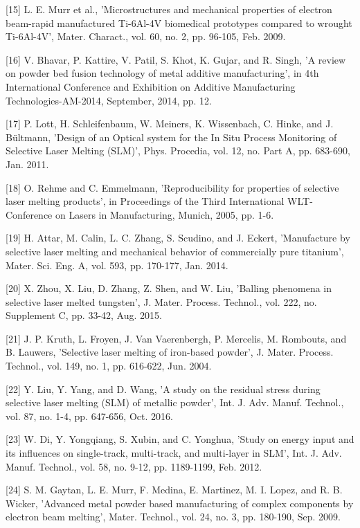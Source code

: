 \documentclass[10pt]{article}
\begin{document}
[15] L. E. Murr et al., 'Microstructures and mechanical properties of electron beam-rapid manufactured Ti-6Al-4V biomedical prototypes compared to wrought Ti-6Al-4V', Mater. Charact., vol. 60, no. 2, pp. 96-105, Feb. 2009.

[16] V. Bhavar, P. Kattire, V. Patil, S. Khot, K. Gujar, and R. Singh, 'A review on powder bed fusion technology of metal additive manufacturing', in 4th International Conference and Exhibition on Additive Manufacturing Technologies-AM-2014, September, 2014, pp. 12.

[17] P. Lott, H. Schleifenbaum, W. Meiners, K. Wissenbach, C. Hinke, and J. Bültmann, 'Design of an Optical system for the In Situ Process Monitoring of Selective Laser Melting (SLM)', Phys. Procedia, vol. 12, no. Part A, pp. 683-690, Jan. 2011.

[18] O. Rehme and C. Emmelmann, 'Reproducibility for properties of selective laser melting products', in Proceedings of the Third International WLT-Conference on Lasers in Manufacturing, Munich, 2005, pp. 1-6.

[19] H. Attar, M. Calin, L. C. Zhang, S. Scudino, and J. Eckert, 'Manufacture by selective laser melting and mechanical behavior of commercially pure titanium', Mater. Sci. Eng. A, vol. 593, pp. 170-177, Jan. 2014.

[20] X. Zhou, X. Liu, D. Zhang, Z. Shen, and W. Liu, 'Balling phenomena in selective laser melted tungsten', J. Mater. Process. Technol., vol. 222, no. Supplement C, pp. 33-42, Aug. 2015.

[21] J. P. Kruth, L. Froyen, J. Van Vaerenbergh, P. Mercelis, M. Rombouts, and B. Lauwers, 'Selective laser melting of iron-based powder', J. Mater. Process. Technol., vol. 149, no. 1, pp. 616-622, Jun. 2004.

[22] Y. Liu, Y. Yang, and D. Wang, 'A study on the residual stress during selective laser melting (SLM) of metallic powder', Int. J. Adv. Manuf. Technol., vol. 87, no. 1-4, pp. 647-656, Oct. 2016.

[23] W. Di, Y. Yongqiang, S. Xubin, and C. Yonghua, 'Study on energy input and its influences on single-track, multi-track, and multi-layer in SLM', Int. J. Adv. Manuf. Technol., vol. 58, no. 9-12, pp. 1189-1199, Feb. 2012.

[24] S. M. Gaytan, L. E. Murr, F. Medina, E. Martinez, M. I. Lopez, and R. B. Wicker, 'Advanced metal powder based manufacturing of complex components by electron beam melting', Mater. Technol., vol. 24, no. 3, pp. 180-190, Sep. 2009.
\end{document}
